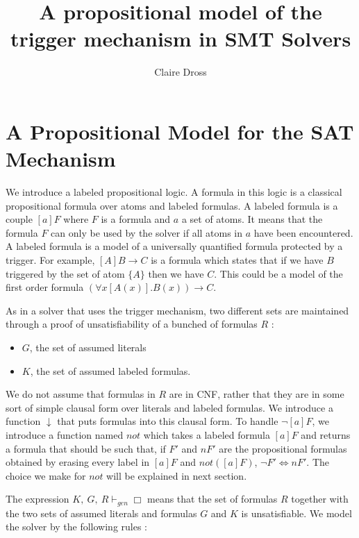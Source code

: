 \documentclass[a4paper,11pt]{article}
\title{A propositional model of the trigger mechanism in SMT Solvers}
\author{Claire Dross}
\newcommand{\gen}{\vdash_\mathit{gen}}
\newcommand{\nnot}{\mathit{not}}
\begin{document}
\maketitle

\begin{abstract}

\end{abstract}

\section{A Propositional Model for the SAT Mechanism}
We introduce a labeled propositional logic. A formula in this logic is a classical propositional
formula over atoms and labeled formulas. A labeled formula is a couple $[a]F$ where $F$ is a
formula and $a$ a set of atoms. It means that the formula $F$ can only be used by the solver if
all atoms in $a$ have been encountered. A labeled formula is a model of a universally quantified
formula protected by a trigger. For example, $[A]B\rightarrow C$ is a formula which states that
if we have $B$ triggered by the set of atom $\{A\}$ then we have $C$. This could be a model of
the first order formula $(\forall x [A(x)]. B(x))\rightarrow C$.

As in a solver that uses the trigger mechanism, two different sets are maintained through a
proof of unsatisfiability of a bunched of formulas $R$ :
\begin{itemize}
 \item $G$, the set of assumed literals
 \item $K$, the set of assumed labeled formulas.
\end{itemize}
We do not assume that formulas in $R$ are in CNF, rather that they are in some sort of simple clausal
form over literals and labeled formulas. We introduce a function $\downarrow$ that puts formulas
into this clausal form. To handle $\neg[a]F$, we introduce a function named $\nnot$ which takes
a labeled formula $[a]F$ and returns a formula that should be such that, if $F'$ and $nF'$ are the 	propositional formulas obtained by erasing every label in $[a]F$ and $\nnot([a]F)$,
$\neg F'\Leftrightarrow nF'$. The choice we make for $\nnot$ will be explained in next section.

The expression $K,\ G,\ R\gen\Box$ means that the set of formulas $R$ together with the two sets
of assumed literals and formulas $G$ and $K$ is unsatisfiable. We model the solver by the following
rules :
\end{document}
